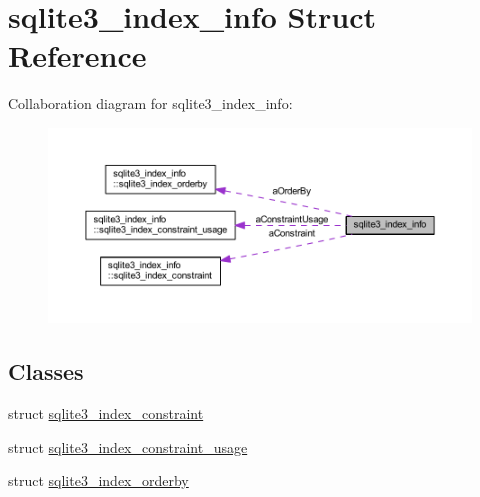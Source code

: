 \hypertarget{structsqlite3__index__info}{\section{sqlite3\-\_\-index\-\_\-info Struct Reference}
\label{structsqlite3__index__info}
}


Collaboration diagram for sqlite3\-\_\-index\-\_\-info\-:\nopagebreak
\begin{figure}[H]
\begin{center}
\leavevmode
\includegraphics[width=350pt]{structsqlite3__index__info__coll__graph}
\end{center}
\end{figure}
\subsection*{Classes}
\begin{DoxyCompactItemize}
\item 
struct \hyperlink{structsqlite3__index__info_1_1sqlite3__index__constraint}{sqlite3\-\_\-index\-\_\-constraint}
\item 
struct \hyperlink{structsqlite3__index__info_1_1sqlite3__index__constraint__usage}{sqlite3\-\_\-index\-\_\-constraint\-\_\-usage}
\item 
struct \hyperlink{structsqlite3__index__info_1_1sqlite3__index__orderby}{sqlite3\-\_\-index\-\_\-orderby}
\end{DoxyCompactItemize}
